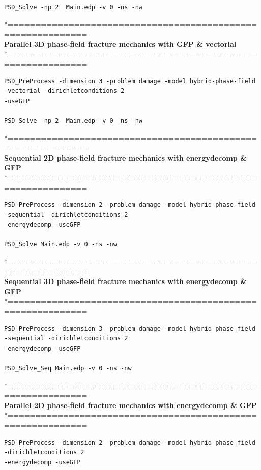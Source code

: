 {{\begin{lstlisting}[style=Linux]
PSD_Solve -np 2  Main.edp -v 0 -ns -nw   
\end{lstlisting}
*============================================================\\
\textbf{ Parallel 3D phase-field fracture mechanics with GFP \& vectorial }\\
*============================================================\\
\begin{lstlisting}[style=Linux]
PSD_PreProcess -dimension 3 -problem damage -model hybrid-phase-field -vectorial -dirichletconditions 2 
-useGFP   

PSD_Solve -np 2  Main.edp -v 0 -ns -nw   
\end{lstlisting}
*============================================================\\
 \textbf{Sequential 2D phase-field fracture mechanics with energydecomp \& GFP} \\
*============================================================\\
\begin{lstlisting}[style=Linux]
PSD_PreProcess -dimension 2 -problem damage -model hybrid-phase-field -sequential -dirichletconditions 2 
-energydecomp -useGFP   

PSD_Solve Main.edp -v 0 -ns -nw   
\end{lstlisting}
*============================================================\\
\textbf{ Sequential 3D phase-field fracture mechanics with energydecomp \& GFP} \\
*============================================================\\
\begin{lstlisting}[style=Linux]
PSD_PreProcess -dimension 3 -problem damage -model hybrid-phase-field -sequential -dirichletconditions 2 
-energydecomp -useGFP   

PSD_Solve_Seq Main.edp -v 0 -ns -nw   
\end{lstlisting}
*============================================================\\
 \textbf{Parallel 2D phase-field fracture mechanics with energydecomp \& GFP} \\
*============================================================\\
\begin{lstlisting}[style=Linux]
PSD_PreProcess -dimension 2 -problem damage -model hybrid-phase-field -dirichletconditions 2 
-energydecomp -useGFP  


\end{lstlisting}}}
